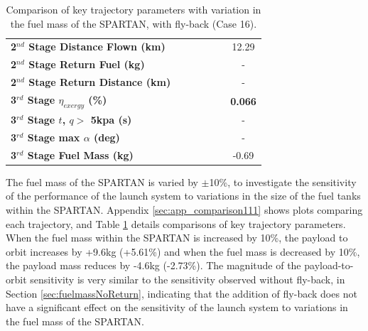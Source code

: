 \begin{table}[ht]
\begin{tabular}{l c c c c c c}
	\textbf{2$^{nd}$ Stage Distance Flown (km)}
	& \SecondDistmFuelNinety
	& \SecondDistmFuelNinetyFive
	& \SecondDistmFuelStandard
	& \SecondDistmFuelOneHundredFive
	& \SecondDistmFuelOneHundredTen
	&12.29
	\\
	\textbf{2$^{nd}$ Stage Return Fuel (kg)}
	& \returnFuelmFuelNinety
	& \returnFuelmFuelNinetyFive
	& \returnFuelmFuelStandard
	& \returnFuelmFuelOneHundredFive
	& \returnFuelmFuelOneHundredTen
	& -
	\\
	\textbf{2$^{nd}$ Stage Return Distance (km)}
	& \returnDistmFuelNinety
	& \returnDistmFuelNinetyFive
	& \returnDistmFuelStandard
	& \returnDistmFuelOneHundredFive
	& \returnDistmFuelOneHundredTen
	& -
	\\
	\hline 
	\textbf{3$^{rd}$ Stage $\eta_{exergy}$ (\%)}
	& \textbf{\thirddExergyEffmFuelNinety}
	& \textbf{\thirddExergyEffmFuelNinetyFive}
	& \textbf{\thirddExergyEffmFuelStandard}
	& \textbf{\thirddExergyEffmFuelOneHundredFive}
	& \textbf{\thirddExergyEffmFuelOneHundredTen}
	& \textbf{0.066}
	\\
	\textbf{3$^{rd}$ Stage $t$, $q >$ 5kpa (s)}
	& \thirdqOverFivemFuelNinety
	& \thirdqOverFivemFuelNinetyFive
	& \thirdqOverFivemFuelStandard
	& \thirdqOverFivemFuelOneHundredFive
	& \thirdqOverFivemFuelOneHundredTen
	& -
	\\
	\textbf{3$^{rd}$ Stage max $\alpha$ (deg)}
	& \thirdmaxAoAmFuelNinety
	& \thirdmaxAoAmFuelNinetyFive
	& \thirdmaxAoAmFuelStandard
	& \thirdmaxAoAmFuelOneHundredFive
	& \thirdmaxAoAmFuelOneHundredTen
	& -
	\\
	\textbf{3$^{rd}$ Stage Fuel Mass (kg)}
	& \thirdmFuelmFuelNinety
	& \thirdmFuelmFuelNinetyFive
	& \thirdmFuelmFuelStandard
	& \thirdmFuelmFuelOneHundredFive
	& \thirdmFuelmFuelOneHundredTen
	&-0.69
	\\
	\hline 
\end{tabular} 
\caption{Comparison of key trajectory parameters with variation in the fuel mass of the SPARTAN, with fly-back (Case 16).}
\label{tab:comparison111}
\end{table}
	
The fuel mass of the SPARTAN is varied by $\pm$10\%, to investigate the sensitivity of the performance of the launch system to variations in the size of the fuel tanks within the SPARTAN. 
Appendix \ref{sec:app_comparison111} shows plots comparing each trajectory, and Table \ref{tab:comparison111} details comparisons of key trajectory parameters. 
When the fuel mass within the SPARTAN is increased by 10\%, the payload to orbit increases by +9.6kg (+5.61\%) and when the fuel mass is decreased by 10\%, the payload mass reduces by -4.6kg (-2.73\%). The magnitude of the payload-to-orbit sensitivity is very similar to the sensitivity observed without fly-back, in Section \ref{sec:fuelmassNoReturn}, indicating that the addition of fly-back does not have a significant effect on the sensitivity of the launch system to variations in the fuel mass of the SPARTAN. 

